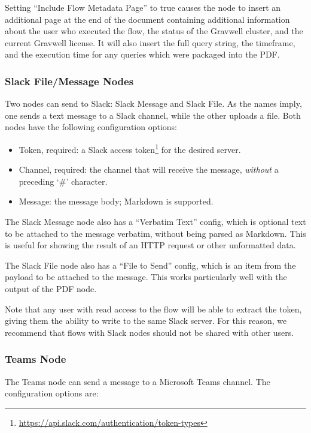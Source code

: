 Setting ``Include Flow Metadata Page'' to true causes the node to insert an additional page at the end of the document containing additional information about the user who executed the flow, the status of the Gravwell cluster, and the current Gravwell license. It will also insert the full query string, the timeframe, and the execution time for any queries which were packaged into the PDF.
\clearpage

\subsubsection{Slack File/Message Nodes}
Two nodes can send to Slack: Slack Message and Slack File. As the names imply, one sends a text message to a Slack channel, while the other uploads a file. Both nodes have the following configuration options:

\begin{itemize}
\item Token, required: a Slack access token\footnote{\href{https://api.slack.com/authentication/token-types}{https://api.slack.com/authentication/token-types}} for the desired server.
\item Channel, required: the channel that will receive the message, \emph{without} a preceding `\#' character.
\item Message: the message body; Markdown is supported.
\end{itemize}

The Slack Message node also has a ``Verbatim Text'' config, which is optional text to be attached to the message verbatim, without being parsed as Markdown. This is useful for showing the result of an HTTP request or other unformatted data.

The Slack File node also has a ``File to Send'' config, which is an item from the payload to be attached to the message. This works particularly well with the output of the PDF node.

Note that any user with read access to the flow will be able to extract the token, giving them the ability to write to the same Slack server. For this reason, we recommend that flows with Slack nodes should not be shared with other users.

\subsubsection{Teams Node}
The Teams node can send a message to a Microsoft Teams channel. The configuration options are:

